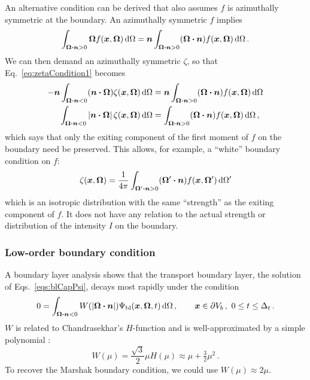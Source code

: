 An alternative condition can be derived that also assumes $f$ is azimuthally
symmetric at the boundary. An azimuthally symmetric $f$ implies
\begin{equation*}
  \int_{\bm{\Omega} \bm{\cdot} \bm{n} > 0}
  \bm{\Omega} f(\bm{x}, \bm{\Omega})\mathop{}\!\mathrm{d}\Omega
  = \bm{n} 
  \int_{\bm{\Omega} \bm{\cdot} \bm{n} > 0}
  (\bm{\Omega} \bm{\cdot} \bm{n} ) f(\bm{x}, \bm{\Omega}) \mathop{}\!\mathrm{d}\Omega\,.
\end{equation*}
We can then demand an azimuthally symmetric $\zeta$, so that
Eq.~\eqref{eq:zetaCondition1} becomes
\begin{align} \nonumber
  -\bm{n} \int_{\bm{\Omega} \bm{\cdot} \bm{n} < 0}
  (\bm{n} \bm{\cdot} \bm{\Omega}) \zeta(\bm{x}, \bm{\Omega})\mathop{}\!\mathrm{d}\Omega
  &= \bm{n} \int_{\bm{\Omega} \bm{\cdot} \bm{n} > 0}
  (\bm{\Omega} \bm{\cdot} \bm{n} ) f(\bm{x}, \bm{\Omega}) \mathop{}\!\mathrm{d}\Omega
\\ \label{eq:zetaGeneral}
  \int_{\bm{\Omega} \bm{\cdot} \bm{n} < 0}
  \left| \bm{n} \bm{\cdot} \bm{\Omega} \right| \zeta(\bm{x}, \bm{\Omega}) \mathop{}\!\mathrm{d}\Omega
  &= \int_{\bm{\Omega} \bm{\cdot} \bm{n} > 0}
  (\bm{\Omega} \bm{\cdot} \bm{n} ) f(\bm{x}, \bm{\Omega}) \mathop{}\!\mathrm{d}\Omega\,,
\end{align}
which says that only the exiting component of the first moment of $f$ on the
boundary need be preserved. This allows, for example, a ``white'' boundary
condition on $f$:
\begin{equation}\label{eq:zetaWhite}
  \zeta(\bm{x}, \bm{\Omega})
  = \frac{1}{4\pi} \int_{\bm{\Omega}' \bm{\cdot} \bm{n} > 0}
  (\bm{\Omega}' \bm{\cdot} \bm{n} ) f(\bm{x}, \bm{\Omega}') \mathop{}\!\mathrm{d}\Omega'
\end{equation}
which is an isotropic distribution with the same ``strength'' as the exiting
component of $f$. It does not have any relation to the actual strength or
distribution of the intensity $I$ on the boundary.


\subsubsection{Low-order boundary condition}
A boundary layer analysis \cite{Mal1991}
shows that the transport boundary layer, the solution of
Eqs.~\eqref{eqs:blCapPsi}, decays most rapidly under the condition
\begin{equation} \label{eq:bcW}
  0 = \int_{\bm{\Omega} \bm{\cdot} \bm{n} < 0} W(\left| \bm{\Omega} \bm{\cdot} \bm{n} \right|)
  \Psi_\mathrm{bl} (\bm{x}, \bm{\Omega}, t) \mathop{}\!\mathrm{d} \Omega\,,\qquad \bm{x} \in
  \partial V_b\,,\ 0 \le t \le \Delta_t\,.
\end{equation}
$W$ is related to Chandrasekhar's $H$-function \cite{Cha1960} and is
well-approximated by a simple polynomial \cite{Mal1991}:
\begin{equation} \label{eq:chandraW}
  W(\mu) = \frac{\sqrt{3}}{2} \mu H(\mu)
  \approx \mu + \tfrac{3}{2} \mu^2 \,.
\end{equation}
To recover the Marshak boundary condition, we could use $W(\mu) \approx 2 \mu$.

